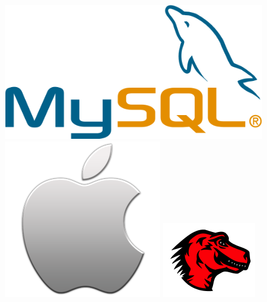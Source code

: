 \documentclass[xcolor=dvipsnames]{beamer}
\begin{document}
\begin{frame}
\begin{figure}
\begin{center}
	\includegraphics[scale=0.15]{mysql.png}
	\hspace{0.2cm}\includegraphics[scale=0.15]{apple_logo.png}
	\hspace{0.2cm}\includegraphics[scale=0.22]{mozilla.png}\\

\end{center}
\end{figure}
\end{frame}
\end{document}
